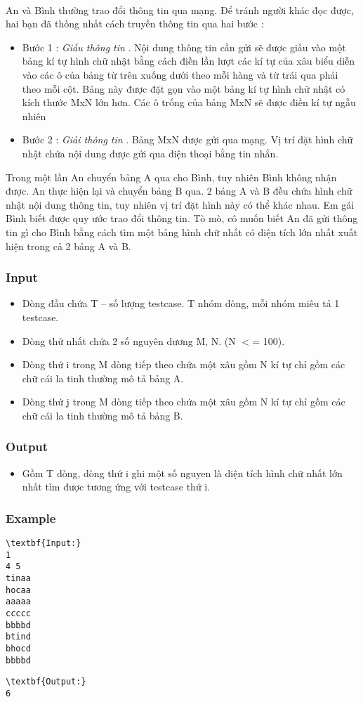 

 

An và Bình thường trao đổi thông tin qua mạng. Để tránh người khác đọc được, hai bạn đã thống nhất cách truyền thông tin qua hai bước :
\begin{itemize}
	\item Bước 1 : \emph{ Giấu thông tin } . Nội dung thông tin cần gửi sẽ được giấu vào một bảng kí tự hình chữ nhật bằng cách điền lần lượt các kí tự của xâu biểu diễn vào các ô của bảng từ trên xuống dưới theo mỗi hàng và từ trái qua phải theo mỗi cột. Bảng này được đặt gọn vào một bảng kí tự hình chữ nhật có kích thước MxN lớn hơn. Các ô trống của bảng MxN sẽ được điền kí tự ngẫu nhiên
\end{itemize}
\begin{itemize}
	\item Bước 2 : \emph{ Giải thông tin } . Bảng MxN được gửi qua mạng. Vị trí đặt hình chữ nhật chứa nội dung được gửi qua điện thoại bằng tin nhắn.
\end{itemize}

Trong một lần An chuyển bảng A qua cho Bình, tuy nhiên Bình không nhận được. An thực hiện lại và chuyển bảng B qua. 2 bảng A và B đều chứa hình chữ nhật nội dung thông tin, tuy nhiên vị trí đặt hình này có thể khác nhau. Em gái Bình biết được quy ước trao đổi thông tin. Tò mò, cô muốn biết An đã gửi thông tin gì cho Bình bằng cách tìm một bảng hình chữ nhất có diện tích lớn nhất xuất hiện trong cả 2 bảng A và B.

\subsubsection{Input}
\begin{itemize}
	\item Dòng đầu chứa T – số lượng testcase. T nhóm dòng, mỗi nhóm miêu tả 1 testcase.
	\item Dòng thứ nhất chứa 2 số nguyên dương M, N. (N $<$= 100).
	\item Dòng thứ i trong M dòng tiếp theo chứa một xâu gồm N kí tự chỉ gồm các chữ cái la tinh thường mô tả bảng A.
	\item Dòng thứ j trong M dòng tiếp theo chứa một xâu gồm N kí tự chỉ gồm các chữ cái la tinh thường mô tả bảng B.
\end{itemize}

\subsubsection{Output}
\begin{itemize}
	\item Gồm T dòng, dòng thứ i ghi một số nguyen là diện tích hình chữ nhất lớn nhất tìm được tương ứng với testcase thứ i.
\end{itemize}

\subsubsection{Example}
\begin{verbatim}
\textbf{Input:}
1
4 5
tinaa
hocaa
aaaaa
ccccc
bbbbd
btind
bhocd
bbbbd\end{verbatim}
\begin{verbatim}
\textbf{Output:}
6\end{verbatim}